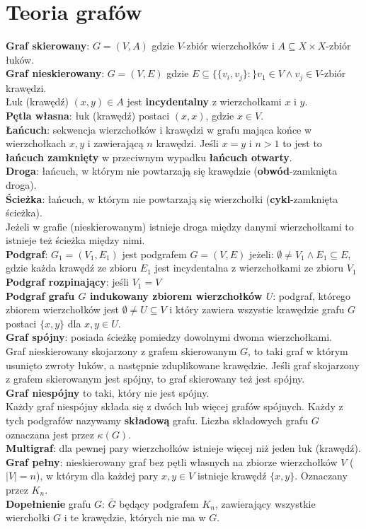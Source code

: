 \documentclass[a4paper,12pt]{article}
\begin{document}
\section{Teoria grafów}
\textbf{Graf skierowany}: $G=(V,A)$ gdzie $V$-zbiór wierzchołków i $A\subseteq X\times X$-zbiór łuków.\\
\textbf{Graf nieskierowany}: $G=(V,E)$ gdzie $E\subseteq \{\{v_i,v_j\}:\}v_1\in V \wedge v_j\in V$-zbiór krawędzi.\\
Łuk (krawędź) $(x,y)\in A$ jest \textbf{incydentalny} z wierzchołkami $x$ i $y$.\\
\textbf{Pętla własna}: łuk (krawędź) postaci $(x,x)$, gdzie $x\in V$. \\
\textbf{Łańcuch}: sekwencja wierzchołków i krawędzi w grafu mająca końce w wierzchołkach $x, y$ i zawierającą $n$ krawędzi. Jeśli $x=y$ i $n>1$ to jest to \textbf{łańcuch zamknięty} w przeciwnym wypadku \textbf{łańcuch otwarty}.\\
\textbf{Droga}: łańcuch, w którym nie powtarzają się krawędzie (\textbf{obwód}-zamknięta droga).\\
\textbf{Ścieżka}: łańcuch, w którym nie powtarzają się wierzchołki (\textbf{cykl}-zamknięta ścieżka).\\
Jeżeli w grafie (nieskierowanym) istnieje droga między danymi wierzchołkami to istnieje też ścieżka między nimi.\\
\textbf{Podgraf}: $G_1=(V_1,E_1)$ jest podgrafem $G=(V,E)$ jeżeli: $\emptyset \neq V_1 \wedge E_1 \subseteq E$, gdzie każda krawędź ze zbioru $E_1$ jest incydentalna z wierzchołkami ze zbioru $V_1$\\
\textbf{Podgraf rozpinający}: jeśli $V_1=V$ \\
\textbf{Podgraf grafu $G$ indukowany zbiorem wierzchołków $U$}: podgraf, którego zbiorem wierzchołków jest $\emptyset\neq U\subseteq V$ i który zawiera wszystie krawędzie grafu $G$ postaci $\{x,y\}$ dla $x,y \in U$. \\
\textbf{Graf spójny}: posiada ścieżkę pomiedzy dowolnymi dwoma wierzchołkami.\\
Graf nieskierowany skojarzony z grafem skierowanym $G$, to taki graf w którym usunięto zwroty łuków, a następnie zduplikowane krawędzie. Jeśli graf skojarzony z grafem skierowanym jest spójny, to graf skierowany też jest spójny. \\
\textbf{Graf niespójny} to taki, który nie jest spójny.\\
Każdy graf niespójny składa się z dwóch lub więcej grafów spójnych. Każdy z tych podgrafów nazywamy \textbf{składową} grafu. Liczba składowych grafu $G$ oznaczana jest przez $\kappa(G)$. \\
\textbf{Multigraf}: dla pewnej pary wierzchołków istnieje więcej niż jeden łuk (krawędź).\\
\textbf{Graf pełny}: nieskierowany graf bez pętli własnych na zbiorze wierzchołków $V$ ($|V|=n$), w którym dla każdej pary $x,y\in V$ istnieje krawędź $\{x,y\}$. Oznaczany przez $K_n$.\\
\textbf{Dopełnienie} grafu $G$: $\bar G$ będący podgrafem $K_n$, zawierający wszystkie wierchołki $G$ i te krawędzie, których nie ma w $G$.
\end{document}
